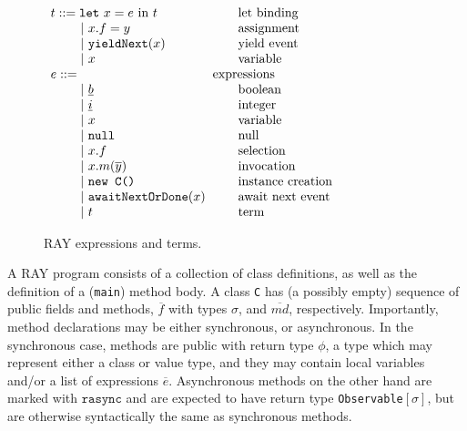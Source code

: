 \documentclass{acm_proc_article-sp}
\newcommand{\gap}{\quad\quad}
\newcommand{\ba}{\begin{array}}
\newcommand{\ea}{\end{array}}
\newcommand{\seq}[1]{\overline{#1}}
\begin{document}
\begin{figure}
  \centering
$\ba[t]{l@{\hspace{2mm}}l}
t    ::=  \texttt{let}~x = e~\mbox{in}~t                 & \gap\mbox{let binding}  \\
\gap ~|~ x.f = y                                         & \gap\mbox{assignment}   \\
\gap ~|~ \texttt{yieldNext}(x)                           & \gap\mbox{yield event}  \\
\gap ~|~ x                                               & \gap\mbox{variable}     \\
e    ::=                                                 & \mbox{expressions}      \\
\gap ~|~ \uline{b}                                       & \gap\mbox{boolean}      \\
\gap ~|~ \uline{i}                                       & \gap\mbox{integer}      \\
\gap ~|~ x                                               & \gap\mbox{variable}     \\
\gap ~|~ \texttt{null}                                        & \gap\mbox{null}          \\
\gap ~|~ x.f                                             & \gap\mbox{selection}    \\
\gap ~|~ x.m(\seq{y})                                    & \gap\mbox{invocation}   \\
\gap ~|~ \texttt{new C()}                                & \gap\mbox{instance creation}   \\
\gap ~|~ \texttt{awaitNextOrDone}(x)                     & \gap\mbox{await next event}   \\
\gap ~|~ t                                               & \gap\mbox{term}         \\
\ea$
  \caption{RAY expressions and terms.}
  \label{fig:lang-syntax-2}
\end{figure}

A RAY program consists of a collection of class definitions, as well as the
definition of a (\texttt{main}) method body. A class \texttt{C} has (a
possibly empty) sequence of  public fields and methods, $\seq{f}$ with types
$\sigma$, and $\seq{md}$, respectively. Importantly, method declarations may be
either synchronous, or asynchronous. In the synchronous case, methods are
public with return type $\phi$, a type which may represent either a class or
value type, and they may contain local variables and/or a list of expressions
$\seq{e}$. Asynchronous methods on the other hand are marked with
$\texttt{rasync}$ and are expected to have return type
\texttt{Observable$[\sigma]$}, but are otherwise syntactically the same
as synchronous methods.
\end{document}
